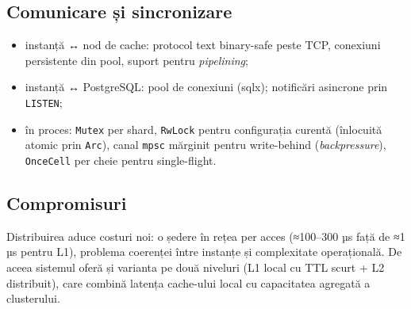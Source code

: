 \subsection{Comunicare și sincronizare}

\begin{itemize}
  \item instanță ↔ nod de cache: protocol text binary-safe peste TCP, conexiuni persistente din pool,
        suport pentru \emph{pipelining};
  \item instanță ↔ PostgreSQL: pool de conexiuni (sqlx); notificări asincrone prin \texttt{LISTEN};
  \item în proces: \texttt{Mutex} per shard, \texttt{RwLock} pentru configurația curentă (înlocuită
        atomic prin \texttt{Arc}), canal \texttt{mpsc} mărginit pentru write-behind (\emph{backpressure}),
        \texttt{OnceCell} per cheie pentru single-flight.
\end{itemize}

\subsection{Compromisuri}

Distribuirea aduce costuri noi: o ședere în rețea per acces (≈100–300 µs față de ≈1 µs pentru L1),
problema coerenței între instanțe și complexitate operațională. De aceea sistemul oferă și varianta pe
două niveluri (L1 local cu TTL scurt + L2 distribuit), care combină latența cache-ului local cu
capacitatea agregată a clusterului.
